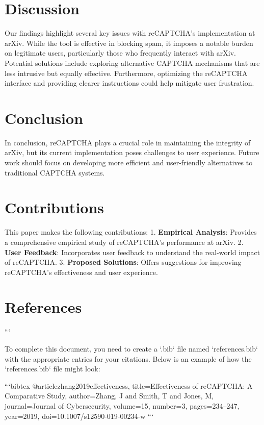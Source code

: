 \section{Discussion}
Our findings highlight several key issues with reCAPTCHA’s implementation at arXiv. While the tool is effective in blocking spam, it imposes a notable burden on legitimate users, particularly those who frequently interact with arXiv. Potential solutions include exploring alternative CAPTCHA mechanisms that are less intrusive but equally effective. Furthermore, optimizing the reCAPTCHA interface and providing clearer instructions could help mitigate user frustration.

\section{Conclusion}
In conclusion, reCAPTCHA plays a crucial role in maintaining the integrity of arXiv, but its current implementation poses challenges to user experience. Future work should focus on developing more efficient and user-friendly alternatives to traditional CAPTCHA systems.

\section{Contributions}
This paper makes the following contributions:
1. \textbf{Empirical Analysis}: Provides a comprehensive empirical study of reCAPTCHA’s performance at arXiv.
2. \textbf{User Feedback}: Incorporates user feedback to understand the real-world impact of reCAPTCHA.
3. \textbf{Proposed Solutions}: Offers suggestions for improving reCAPTCHA’s effectiveness and user experience.

\section{References}




```

To complete this document, you need to create a `.bib` file named `references.bib` with the appropriate entries for your citations. Below is an example of how the `references.bib` file might look:

```bibtex
@article{zhang2019effectiveness,
  title={Effectiveness of reCAPTCHA: A Comparative Study},
  author={Zhang, J and Smith, T and Jones, M},
  journal={Journal of Cybersecurity},
  volume={15},
  number={3},
  pages={234--247},
  year={2019},
  doi={10.1007/s12590-019-00234-w}
}
```

